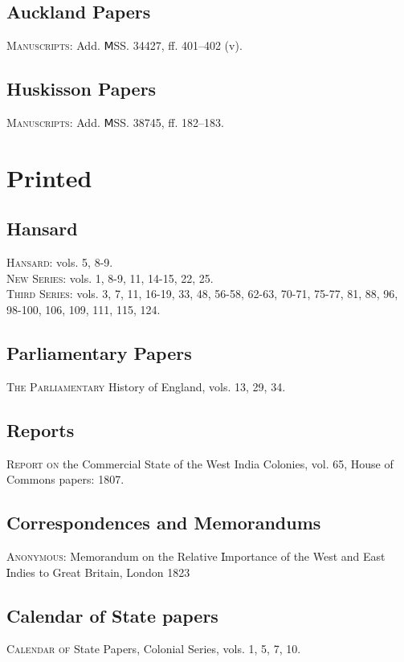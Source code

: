 \subsection{Auckland Papers}
\textsc{Manuscripts}: Add. ⅯSS. 34427, ff. 401–402 (v).
\subsection{Huskisson Papers}
\textsc{Manuscripts}: Add. ⅯSS. 38745, ff. 182–183.
\section{Printed}
\subsection{Hansard}
\textsc{Hansard}: vols. 5, 8-9. \\
\textsc{New Series}: vols. 1, 8-9, 11, 14-15, 22, 25. \\
\textsc{Third Series}: vols. 3, 7, 11, 16-19, 33, 48, 56-58, 62-63, 70-71, 75-77, 81, 88, 96, 98-100, 106, 109, 111, 115, 124.
\subsection{Parliamentary Papers}
\textsc{The Parliamentary} History of England, vols. 13, 29, 34.
\subsection{Reports}
\textsc{Report on} the Commercial State of the West India Colonies, vol. 65, House of Commons papers: 1807.
\subsection{Correspondences and Memorandums}
\textsc{Anonymous}: Memorandum on the Relative Ɪmportance of the West and East Ɪndies to Great Britain, London 1823
\subsection{Calendar of State papers}
\textsc{Calendar of} State Papers, Colonial Series, vols. 1, 5, 7, 10.